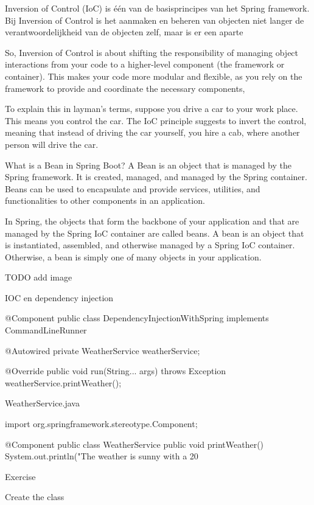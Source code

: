 Inversion of Control (IoC) is \'e\'en van de basisprincipes van het Spring framework.
Bij Inversion of Control is het aanmaken en beheren van objecten niet langer de verantwoordelijkheid van de objecten zelf, maar is er een aparte 

So, Inversion of Control is about shifting the responsibility of managing object interactions from your code to a higher-level component (the framework or container). This makes your code more modular and flexible, as you rely on the framework to provide and coordinate the necessary components, 

To explain this in layman's terms, suppose you drive a car to your work place. This means you control the car. The IoC principle suggests to invert the control, meaning that instead of driving the car yourself, you hire a cab, where another person will drive the car.

What is a Bean in Spring Boot? A Bean is an object that is managed by the Spring framework. It is created, managed, and managed by the Spring container. Beans can be used to encapsulate and provide services, utilities, and functionalities to other components in an application.

In Spring, the objects that form the backbone of your application and that are managed by the Spring IoC container are called beans. A bean is an object that is instantiated, assembled, and otherwise managed by a Spring IoC container. Otherwise, a bean is simply one of many objects in your application.

TODO add image





IOC en dependency injection 


@Component
public class DependencyInjectionWithSpring implements CommandLineRunner {
   
   @Autowired
   private WeatherService weatherService;
   
   @Override    
   public void run(String... args) throws Exception {
	   weatherService.printWeather();
   }
}

WeatherService.java

import org.springframework.stereotype.Component;

@Component
public class WeatherService {
   public void printWeather() {
      System.out.println("The weather is sunny with a 20%
   }
}


Exercise

Create the class 





